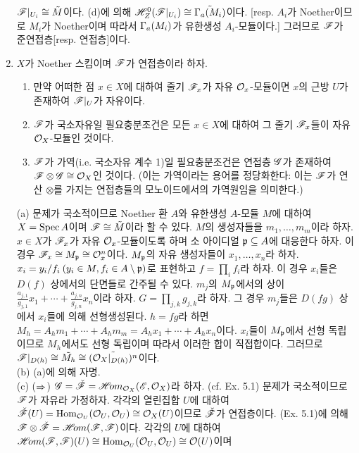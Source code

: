 \begin{enumerate}[label=\tb{5.\arabic*.},itemindent=0mm,itemsep=4mm]
	$\mathscr{F}|_{U_i}\cong\tilde M$이다. (d)에 의해 $\mathscr{H}^0_Z(\mathscr{F}|_{U_i})\cong\tilde{\Gamma_a(M_i)}$이다.
	[resp. $A_i$가 Noether이므로 $M_i$가 Noether이며 따라서 $\Gamma_a(M_i)$가 유한생성 $A_i$-모듈이다.]
	그러므로 $\mathscr{F}$가 준연접층[resp. 연접층]이다.
	\item $X$가 Noether 스킴이며 $\mathscr{F}$가 연접층이라 하자.
	\begin{enumerate}[label=(\alph*)]
	\item 만약 어떠한 점 $x\in X$에 대하여 줄기 $\mathscr{F}_x$가 자유 $\mathcal{O}_x$-모듈이면
	$x$의 근방 $U$가 존재하여 $\mathscr{F}|_U$가 자유이다.
	\item $\mathscr{F}$가 국소자유일 필요충분조건은 모든 $x\in X$에 대하여 그 줄기 $\mathscr{F}_x$들이 자유 $\mathcal{O}_X$-모듈인 것이다.
	\item $\mathscr{F}$가 가역(i.e. 국소자유 계수 1)일 필요충분조건은 연접층 $\mathscr{G}$가 존재하여 $\mathscr{F}\otimes\mathscr{G}\cong\mathcal{O}_X$인 것이다.
	(이는 가역이라는 용어를 정당화한다: 이는 $\mathscr{F}$가 연산 $\otimes$를 가지는 연접층들의 모노이드에서의 가역원임을 의미한다.)
	\end{enumerate}
	\sol (a) 문제가 국소적이므로 Noether 환 $A$와 유한생성 $A$-모듈 $M$에 대하여
	$X=\operatorname{Spec} A$이며 $\mathscr{F}\cong\tilde M$이라 할 수 있다.
	$M$의 생성자들을 $m_1,\ldots,m_m$이라 하자.
	$x\in X$가 $\mathscr{F}_x$가 자유 $\mathcal{O}_x$-모듈이도록 하며 소 아이디얼 $\mathfrak{p}\subseteq A$에 대응한다 하자.
	이 경우 $\mathscr{F}_x\cong M_{\mathfrak{p}}\cong\mathcal{O}_x^n$이다.
	$M_{\mathfrak{p}}$의 자유 생성자들이 $x_1,\ldots,x_n$라 하자.
	$x_i=y_i/f_i\:(y_i\in M,f_i\in A\setminus\mathfrak{p})$로 표현하고 $f=\prod_if_i$라 하자.
	이 경우 $x_i$들은 $D(f)$ 상에서의 단면들로 간주될 수 있다.
	$m_j$의 $M_{\mathfrak{p}}$에서의 상이 $\frac{a_{j,1}}{g_{j,1}}x_1+\cdots+\frac{a_{j,n}}{g_{j,n}}x_n$이라 하자.
	$G=\prod_{j,k}g_{j,k}$라 하자. 그 경우 $m_j$들은 $D(fg)$ 상에서 $x_i$들에 의해 선형생성된다.
	$h=fg$라 하면 $M_h=A_hm_1+\cdots+A_hm_m=A_hx_1+\cdots+A_hx_n$이다.
	$x_i$들이 $M_{\mathfrak{p}}$에서 선형 독립이므로 $M_h$에서도 선형 독립이며 따라서 이러한 합이 직접합이다.
	그러므로 $\mathscr{F}|_{D(h)}\cong\tilde{M_h}\cong\tilde{(\mathcal{O}_X|_{D(h)})^n}$이다.\\
	(b) (a)에 의해 자명.\\
	(c) ($\Rightarrow$) $\mathscr{G}=\check{\mathscr{F}}=\mathscr{H}\!om_{\mathcal{O}_X}(\mathscr{E},\mathcal{O}_X)$라 하자. (cf. Ex. 5.1)
	문제가 국소적이므로 $\mathscr{F}$가 자유라 가정하자.
	각각의 열린집합 $U$에 대하여 $\check{\mathscr{F}}(U)=\operatorname{Hom}_{\mathcal{O}_U}(\mathcal{O}_U,\mathcal{O}_U)\cong\mathcal{O}_X(U)$이므로
	$\check{\mathscr{F}}$가 연접층이다.
	(Ex. 5.1)에 의해 $\mathscr{F}\otimes\check{\mathscr{F}}=\mathscr{H}\!om(\mathscr{F},\mathscr{F})$이다.
	각각의 $U$에 대하여 $\mathscr{H}\!om(\mathscr{F},\mathscr{F})(U)\cong\operatorname{Hom}_{\mathcal{O}_U}(\mathcal{O}_U,\mathcal{O}_U)\cong\mathcal{O}(U)$이며

\end{enumerate}
